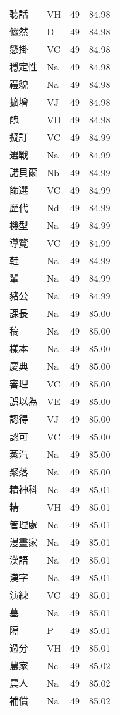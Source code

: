 \documentclass[twocolumn]{book}
\begin{document}
\begin{supertabular}{llrr}
聽話 & VH & 49 &  84.98\\
儼然 & D & 49 &  84.98\\
懸掛 & VC & 49 &  84.98\\
穩定性 & Na & 49 &  84.98\\
禮貌 & Na & 49 &  84.98\\
擴增 & VJ & 49 &  84.98\\
醜 & VH & 49 &  84.98\\
擬訂 & VC & 49 &  84.99\\
選戰 & Na & 49 &  84.99\\
諾貝爾 & Nb & 49 &  84.99\\
篩選 & VC & 49 &  84.99\\
歷代 & Nd & 49 &  84.99\\
機型 & Na & 49 &  84.99\\
導覽 & VC & 49 &  84.99\\
鞋 & Na & 49 &  84.99\\
輩 & Na & 49 &  84.99\\
豬公 & Na & 49 &  84.99\\
課長 & Na & 49 &  85.00\\
稿 & Na & 49 &  85.00\\
樣本 & Na & 49 &  85.00\\
慶典 & Na & 49 &  85.00\\
審理 & VC & 49 &  85.00\\
誤以為 & VE & 49 &  85.00\\
認得 & VJ & 49 &  85.00\\
認可 & VC & 49 &  85.00\\
蒸汽 & Na & 49 &  85.00\\
聚落 & Na & 49 &  85.00\\
精神科 & Nc & 49 &  85.01\\
精 & VH & 49 &  85.01\\
管理處 & Nc & 49 &  85.01\\
漫畫家 & Na & 49 &  85.01\\
漢語 & Na & 49 &  85.01\\
漢字 & Na & 49 &  85.01\\
演練 & VC & 49 &  85.01\\
墓 & Na & 49 &  85.01\\
隔 & P & 49 &  85.01\\
過分 & VH & 49 &  85.01\\
農家 & Nc & 49 &  85.02\\
農人 & Na & 49 &  85.02\\
補償 & Na & 49 &  85.02\\

\end{supertabular}
\end{document}
